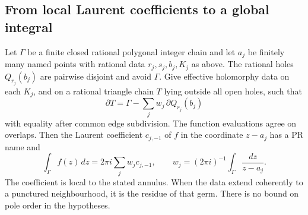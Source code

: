 

\subsection{From local Laurent coefficients to a global integral}

\begin{theorem}\label{thm:analytic-named}
Let $\Gamma$ be a finite closed rational polygonal integer chain and
let $a_j$ be finitely many named points with rational data $r_j,s_j,b_j,K_j$
as above. The rational holes $Q_{r_j}(b_j)$ are pairwise disjoint and
avoid $\Gamma$. Give effective holomorphy data on each $K_j$, and on
a rational triangle chain $T$ lying outside all open holes, such that
\[
 \partial T=\Gamma-\sum_j w_j\,\partial Q_{r_j}(b_j)
\]
with equality after common edge subdivision. The function evaluations
agree on overlaps. Then the Laurent coefficient $c_{j,-1}$ of $f$ in
the coordinate $z-a_j$ has a PR name and
\[
 \int_\Gamma f(z)\,dz=2\pi i\sum_j w_j c_{j,-1},
 \qquad w_j=(2\pi i)^{-1}\int_\Gamma\frac{dz}{z-a_j}.
\]
The coefficient is local to the stated annulus. When the data extend
coherently to a punctured neighbourhood, it is the residue of that germ.
There is no bound on pole order in the hypotheses.
\end{theorem}
